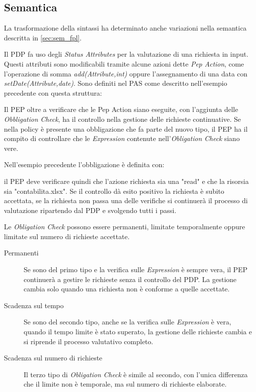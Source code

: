 \subsection*{Semantica}
\label{sub:Semantica_Ext}
La trasformazione della sintassi ha determinato anche variazioni nella semantica descritta in \ref{sec:sem_fpl}.\par
Il PDP fa uso degli \emph{Status Attributes} per la valutazione di una richiesta in input.
Questi attributi sono modificabili tramite alcune azioni dette \emph{Pep Action}, come l'operazione di somma \emph{add(Attribute,int)}
oppure l'assegnamento di una data con \emph{setDate(Attribute,date)}.
Sono definiti nel PAS come descritto nell'esempio precedente con questa struttura:

\par Il PEP oltre a verificare che le Pep Action siano eseguite, con l'aggiunta delle \emph{Obbligation Check}, ha il
controllo nella gestione delle richieste continuative. Se nella policy è presente una obbligazione che fa parte del nuovo tipo,
il PEP ha il compito di controllare che le \emph{Expression} contenute nell'\emph{Obligation Check} siano vere.\par
Nell'esempio precedente l'obbligazione è definita con:

il PEP deve verificare quindi che l'azione richiesta sia una "read" e che la risorsia sia "contabilita.xlsx".
Se il controllo dà esito positivo la richiesta è subito accettata, se la richiesta non passa una delle verifiche si continuerà
il processo di valutazione ripartendo dal PDP e svolgendo tutti i passi.\\\par
Le \emph{Obligation Check} possono essere permanenti, limitate temporalmente oppure limitate sul numero di richieste
accettate.\par
\begin{description}
  \item[Permanenti]Se sono del primo tipo e la verifica sulle \emph{Expression} è sempre vera, il PEP continuerà a gestire le
  richieste senza il controllo del PDP. La gestione cambia solo quando una richiesta non è conforme a quelle accettate.\par
  \item[Scadenza sul tempo]Se sono del secondo tipo, anche se la verifica sulle \emph{Expression} è vera, quando il tempo limite è stato superato,
  la gestione delle richieste cambia e si riprende il processo valutativo completo.
  \item[Scadenza sul numero di richieste]Il terzo tipo di \emph{Obligation Check} è simile al secondo, con l'unica differenza che il limite non è temporale,
  ma sul numero di richieste elaborate.
\end{description}

